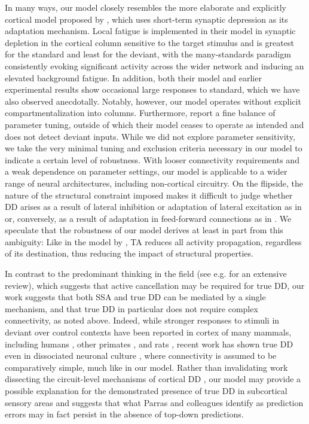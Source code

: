 \documentclass[9pt,lineno,onehalfspacing]{elife}
\begin{document}
In many ways, our model closely resembles the more elaborate and explicitly cortical model proposed by \cite{Yarden2017-eh}, which uses short-term synaptic depression as its adaptation mechanism. Local fatigue is implemented in their model in synaptic depletion in the cortical column sensitive to the target stimulus and is greatest for the standard and least for the deviant, with the many-standards paradigm consistently evoking significant activity across the wider network and inducing an elevated background fatigue. In addition, both their model and earlier experimental results \citep{Hershenhoren2014-bb} show occasional large responses to standard, which we have also observed anecdotally. Notably, however, our model operates without explicit compartmentalization into columns. Furthermore, \cite{Yarden2017-eh} report a fine balance of parameter tuning, outside of which their model ceases to operate as intended and does not detect deviant inputs. While we did not explore parameter sensitivity, we take the very minimal tuning and exclusion criteria necessary in our model to indicate a certain level of robustness. With looser connectivity requirements and a weak dependence on parameter settings, our model is applicable to a wider range of neural architectures, including non-cortical circuitry. On the flipside, the nature of the structural constraint imposed makes it difficult to judge whether DD arises as a result of lateral inhibition or adaptation of lateral excitation as in \citep{Yarden2017-eh, Hertag2020-kc, Park2020-oa} or, conversely, as a result of adaptation in feed-forward connections as in \cite{Mill2011-ah}. We speculate that the robustness of our model derives at least in part from this ambiguity: Like in the model by \cite{May2015-lt}, TA reduces all activity propagation, regardless of its destination, thus reducing the impact of structural properties.

In contrast to the predominant thinking in the field (see e.g. \cite{Ross2020-qf} for an extensive review), which suggests that active cancellation may be required for true DD, our work suggests that both SSA and true DD can be mediated by a single mechanism, and that true DD in particular does not require complex connectivity, as noted above. Indeed, while stronger responses to stimuli in deviant over control contexts have been reported in cortex of many mammals, including humans \citep{Tada2019-lj}, other primates \citep{Takaura2016-eh}, and rats \citep{Taaseh2011-gg, Shiramatsu2013-qz, Harms2014-ah}, recent work has shown true DD even in dissociated neuronal culture \citep{Kubota2021-dx}, where connectivity is assumed to be comparatively simple, much like in our model. Rather than invalidating work dissecting the circuit-level mechanisms of cortical DD \citep{Hamm2016-lm, Attinger2017-dw, Yarden2022-yy}, our model may provide a possible explanation for the demonstrated presence of true DD in subcortical sensory areas \citep{Parras2017-fp} and suggests that what Parras and colleagues identify as prediction errors may in fact persist in the absence of top-down predictions.
\end{document}
